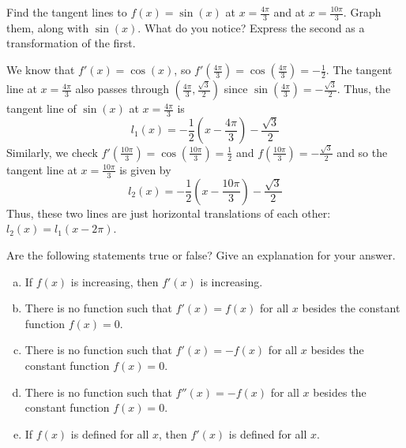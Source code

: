 \documentclass[11pt]{exam}
\begin{document}
\begin{questions}
  \question Find the tangent lines to $f(x)=\sin(x)$ at $x=\frac{4\pi}{3}$  and at $x=\frac{10\pi}{3}$.  Graph them, along with $\sin(x)$.  What do you notice?  Express the second as a transformation of the first.
    \begin{solution}
      We know that \(f'(x) = \cos(x)\), so \(f'\left( \frac{4\pi}{3}
      \right) = \cos\left(\frac{4\pi}{3}\right) =
      -\frac{1}{2}\). The tangent line at \(x=\frac{4\pi}{3}\) also
      passes through \((\frac{4\pi}{3}, \frac{\sqrt{3}}{2})\) since
      \(\sin\left(\frac{4\pi}{3}\right) = -\frac{\sqrt{3}}{2}\). Thus, the
      tangent line of \(\sin(x)\) at \(x = \frac{4\pi}{3}\) is \[
        l_1(x) = -\frac{1}{2}\left(x-\frac{4\pi}{3}\right)-\frac{\sqrt{3}}{2}
      \]
      Similarly, we check \(f'\left( \frac{10\pi}{3} \right) = \cos\left(\frac{10\pi}{3}\right) =
      \frac{1}{2}\) and \(f\left( \frac{10\pi}{3} \right) =
      -\frac{\sqrt{3}}{2}\) and so the tangent line at
      \(x=\frac{10\pi}{3}\) is given by \[
        l_2(x) = -\frac{1}{2}\left(x-\frac{10\pi}{3}\right)-\frac{\sqrt{3}}{2}
      \]
      Thus, these two lines are just horizontal translations of each
      other: \(l_2(x) = l_1(x-2\pi)\).
    \end{solution}
    \vspace{1em}
  \question Are the following statements true or false? Give an explanation for your answer.
\begin{enumerate}[(a)]
	\item If $f(x)$ is increasing, then $f'(x)$ is increasing.
	\item There is no function such that $f'(x) = f(x)$ for all $x$ besides the constant function $f(x)=0$.
	\item There is no function such that $f'(x) = -f(x)$ for all $x$ besides the constant function $f(x)=0$.
	\item There is no function such that $f''(x) = -f(x)$ for all $x$ besides the constant function $f(x)=0$.
	\item If $f(x)$ is defined for all $x$, then $f'(x)$ is defined for all $x$.
\end{enumerate}
\begin{solution}
\end{solution}
\end{questions}
\end{document}
